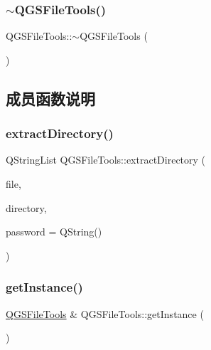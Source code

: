\subsubsection{\texorpdfstring{$\sim$\+Q\+G\+S\+File\+Tools()}{~QGSFileTools()}}
{\footnotesize\ttfamily Q\+G\+S\+File\+Tools\+::$\sim$\+Q\+G\+S\+File\+Tools (\begin{DoxyParamCaption}{ }\end{DoxyParamCaption})\hspace{0.3cm}{\ttfamily [virtual]}}



\subsection{成员函数说明}
\mbox{\label{class_q_g_s_file_tools_a388d961a6c2ea3a9c84f032be758fe7e}} 
\subsubsection{\texorpdfstring{extract\+Directory()}{extractDirectory()}}
{\footnotesize\ttfamily Q\+String\+List Q\+G\+S\+File\+Tools\+::extract\+Directory (\begin{DoxyParamCaption}\item[{const Q\+String \&}]{file,  }\item[{const Q\+String \&}]{directory,  }\item[{const Q\+String \&}]{password = {\ttfamily QString()} }\end{DoxyParamCaption})\hspace{0.3cm}{\ttfamily [static]}}

\mbox{\label{class_q_g_s_file_tools_a679f7d19d6847e85438e924d94784384}} 
\subsubsection{\texorpdfstring{get\+Instance()}{getInstance()}}
{\footnotesize\ttfamily \mbox{\hyperlink{class_q_g_s_file_tools}{Q\+G\+S\+File\+Tools}} \& Q\+G\+S\+File\+Tools\+::get\+Instance (\begin{DoxyParamCaption}{ }\end{DoxyParamCaption})\hspace{0.3cm}{\ttfamily [static]}}

